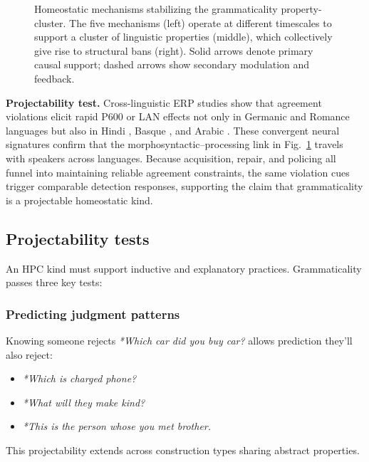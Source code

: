 \documentclass[12pt]{article}
\begin{document}
\begin{figure}[htbp]
\caption{Homeostatic mechanisms stabilizing the grammaticality property-cluster. The five mechanisms (left) operate at different timescales to support a cluster of linguistic properties (middle), which collectively give rise to structural bans (right). Solid arrows denote primary causal support; dashed arrows show secondary modulation and feedback.}
\label{fig:homeostasis}
\end{figure}

\textbf{Projectability test.}  
Cross-linguistic ERP studies show that agreement violations elicit rapid
P600 or LAN effects not only in Germanic and Romance languages but also in Hindi
\parencite{Nevins2007}, Basque \parencite{Zawiszewski2009}, and Arabic
\parencite{MuralikrishnanIdrissi2021}. 
These convergent neural signatures confirm that the morphosyntactic–processing
link in Fig.~\ref{fig:homeostasis} travels with speakers across languages. 
Because acquisition, repair, and policing all funnel into maintaining reliable
agreement constraints, the same violation cues trigger comparable detection
responses, supporting the claim that grammaticality is a projectable
homeostatic kind.

\subsection{Projectability tests}

An HPC kind must support inductive and explanatory practices. Grammaticality passes three key tests:

\subsubsection{Predicting judgment patterns}

Knowing someone rejects \textit{*Which car did you buy car?} allows prediction they'll also reject:
\begin{itemize}
    \item \textit{*Which is charged phone?}
    \item \textit{*What will they make kind?}
    \item \textit{*This is the person whose you met brother.}
\end{itemize}
This projectability extends across construction types sharing abstract properties.
\end{document}
